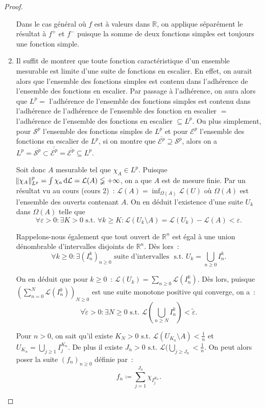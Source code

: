 \documentclass{article}
\theoremstyle{definition}
\newcommand{\pinfty}{{+\infty}}
\newcommand{\st}{\text{ s.t. }}
\newcommand{\R}{{\mathbb R}}
\begin{document}
\begin{proof}
\begin{enumerate}
	Dans le cas général où $f$ est à valeurs dans $\R$, on applique séparément le résultat à $f^+$ et $f^-$ puisque la somme de deux fonctions simples est toujours une fonction simple.

	\item Il suffit de montrer que toute fonction caractéristique d'un ensemble mesurable est limite d'une suite de fonctions en escalier. En effet, on aurait alors que
	l'ensemble des fonctions simples est contenu dans l'adhérence de l'ensemble des fonctions en escalier. Par passage à l'adhérence, on aura alors que $L^p =$ l'adhérence
	de l'ensemble des fonctions simples est contenu dans l'adhérence de l'adhérence de l'ensemble des fonction en escalier $=$ l'adhérence de l'ensemble des fonctions en escalier
	$\subseteq L^p$. Ou plus simplement, pour $\mathcal S^p$ l'ensemble des fonctions simples de $L^p$ et pour $\mathcal E^p$ l'ensemble des fonctions en escalier de $L^p$, si on montre
	que $\overline {\mathcal E^p} \supseteq \mathcal S^p$, alors on a $L^p = \overline {\mathcal S^p} \subset \overline {\overline {\mathcal E^p}}=\overline {\mathcal E^p} \subseteq L^p$.

	Soit donc $A$ mesurable tel que $\chi_A \in L^p$. Puisque $\norm {\chi_A}_{L^p}^p = \int\chi_a\dif\mathcal L = \mathcal L(A) \lneqq \pinfty$, on a que $A$ est de mesure finie.
	Par un résultat vu au cours (cours 2)~: $\mathcal L(A) = \inf_{\Omega(A)}\mathcal L(U)$ où $\Omega(A)$ est l'ensemble des ouverts contenant $A$. On en déduit l'existence d'une
	suite $U_k$ dans $\Omega(A)$ telle que
	\[\forall \varepsilon > 0 : \exists K > 0 \st \forall k \geq K : \mathcal L(U_k \setminus A) = \mathcal L(U_k)-\mathcal L(A) < \varepsilon.\]

	Rappelons-nous également que tout ouvert de $\R^n$ est égal à une union dénombrable d'intervalles disjoints de $\R^n$. Dès lors~:
	\[\forall k \geq 0 : \exists (I^k_n)_{n \geq 0} \text{ suite d'intervalles } \st U_k = \bigcup_{n \geq 0}I^k_n.\]

	On en déduit que pour $k \geq 0$~: $\mathcal L(U_k) = \sum_{n \geq 0}\mathcal L(I^k_n)$. Dès lors, puisque $(\sum_{n=0}^N\mathcal L(I^k_n))_{N \geq 0}$ est une suite monotone
	positive qui converge, on a~:
	\[\forall \tilde \varepsilon > 0 : \exists N \geq 0 \st \mathcal L\left(\bigcup_{n \geq N}I^k_n\right) < \tilde \varepsilon.\]

	Pour $n > 0$, on sait qu'il existe $K_N > 0 \st \mathcal L(U_{K_n} \setminus A) < \frac 1n$ et $U_{K_n} = \bigcup_{j \geq 1}I_j^{K_n}$. De plus il existe
	$J_n > 0 \st \mathcal L(\bigcup_{j \geq J_n} < \frac 1n$. On peut alors poser la suite $(f_n)_{n \geq 0}$ définie par~:
	\[f_n \coloneqq \sum_{j=1}^{J_n}\chi_{I_j^{K_n}}.\]


\end{enumerate}
\end{proof}
\end{document}
